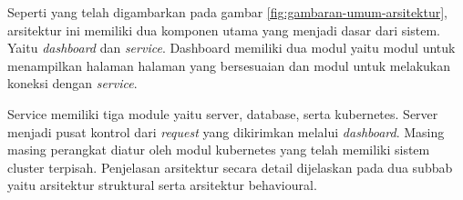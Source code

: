 Seperti yang telah digambarkan pada gambar \ref{fig:gambaran-umum-arsitektur}, arsitektur ini memiliki dua komponen utama yang menjadi dasar dari sistem. Yaitu \textit{dashboard} dan \textit{service}. Dashboard memiliki dua modul yaitu modul untuk menampilkan halaman halaman yang bersesuaian dan modul untuk melakukan koneksi dengan \textit{service}.

Service memiliki tiga module yaitu server, database, serta kubernetes. Server menjadi pusat kontrol dari \textit{request} yang dikirimkan melalui \textit{dashboard}. Masing masing perangkat diatur oleh modul kubernetes yang telah memiliki sistem cluster terpisah. Penjelasan arsitektur secara detail dijelaskan pada dua subbab yaitu arsitektur struktural serta arsitektur behavioural.



